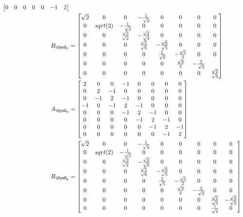 \begin{align*}
\begin{bmatrix}
 0 & 0 & 0 & 0 & 0 & -1 & 2\\
 \end{bmatrix}\\
 R_{\DynE_{7}} &  =  \begin{bmatrix}
 \sqrt{2} & 0 & 0 & -\frac{1}{\sqrt{2}} & 0 & 0 & 0 & 0\\
 0 & sqrt(2) & - \frac{1}{\sqrt{2}}& 0 & 0 & 0 & 0 & 0\\
 0 & 0 & \frac{\sqrt{3}}{\sqrt{2}} & -\frac{\sqrt{2}}{\sqrt{3}} & 0 & 0 & 0 & 0\\
 0 & 0 & 0 & \frac{\sqrt{5}}{\sqrt{6}} & -\frac{\sqrt{6}}{\sqrt{5}} & 0 & 0 & 0\\
 0 & 0 & 0 & 0 & \frac{2}{\sqrt{5}} & -\frac{\sqrt{5}}{2} & 0 & 0\\
 0 & 0 & 0 & 0 & 0 & \frac{\sqrt{3}}{2} & -\frac{2}{\sqrt{3}}\\
 0 & 0 & 0 & 0 & 0 & 0 & 0 & \frac{\sqrt{2}}{\sqrt{3}}\\
 \end{bmatrix}\\
 A_{\DynE_{8}} &  = \begin{bmatrix}
 2 & 0 & 0 & -1 & 0 & 0 & 0 & 0\\
 0 & 2 & -1 & 0 & 0 & 0 & 0 & 0\\
 0 & -1 & 2 & -1 & 0 & 0 & 0 & 0\\
 -1 & 0 & -1 & 2 & -1 & 0 & 0 & 0\\
 0 & 0 & 0 & -1 & 2 & -1 & 0 & 0 \\
 0 & 0 & 0 & 0 & -1 & 2 & -1 & 0\\
 0 & 0 & 0 & 0 & 0 & -1 & 2 & -1\\
 0 & 0 & 0 & 0 & 0 & 0 & -1 & 2\\
 \end{bmatrix}\\
 R_{\DynE_{8}} &  = \begin{bmatrix}
 \sqrt{2} & 0 & 0 & -\frac{1}{\sqrt{2}} & 0 & 0 & 0 & 0 & 0\\
 0 & sqrt(2) & - \frac{1}{\sqrt{2}}& 0 & 0 & 0 & 0 & 0 & 0\\
 0 & 0 & \frac{\sqrt{3}}{\sqrt{2}} & -\frac{\sqrt{2}}{\sqrt{3}} & 0 & 0 & 0 & 0 & 0\\
 0 & 0 & 0 & \frac{\sqrt{5}}{\sqrt{6}} & -\frac{\sqrt{6}}{\sqrt{5}} & 0 & 0 & 0 & 0\\
 0 & 0 & 0 & 0 & \frac{2}{\sqrt{5}} & -\frac{\sqrt{5}}{2} & 0 & 0 & 0\\
 0 & 0 & 0 & 0 & 0 & \frac{\sqrt{3}}{2} & -\frac{2}{\sqrt{3}} & 0 & 0\\
 0 & 0 & 0 & 0 & 0 & 0 & 0 & \frac{\sqrt{2}}{\sqrt{3}} & - \frac{\sqrt{3}}{\sqrt{2}}\\
 0 & 0 & 0 & 0 & 0 & 0 & 0 & \frac{1}{\sqrt{2}} & 0\\
 \end{bmatrix}
\end{align*}

